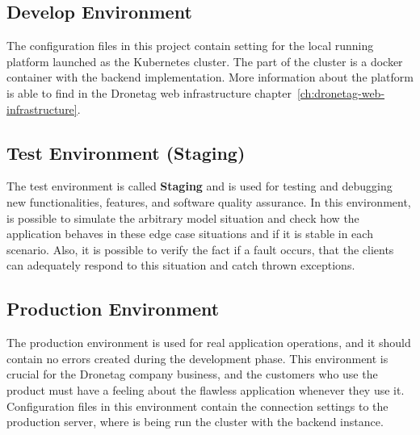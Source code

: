 \subsection{Develop Environment}\label{subsec:develop-environment}
The configuration files in this project contain setting for the local running platform launched as the Kubernetes cluster.
The part of the cluster is a docker container with the backend implementation.
More information about the platform is able to find in the Dronetag web infrastructure chapter~\ref{ch:dronetag-web-infrastructure}.


\subsection{Test Environment (Staging)}\label{subsec:test-environment}
The test environment is called \textbf{Staging} and is used for testing and debugging new functionalities, features, and software quality assurance.\cite{sqa}
In this environment, is possible to simulate the arbitrary model situation and check how the application behaves in these edge case situations and if it is stable in each scenario.
Also, it is possible to verify the fact if a fault occurs, that the clients can adequately respond to this situation and catch thrown exceptions.


\subsection{Production Environment}\label{subsec:production-environment}
The production environment is used for real application operations, and it should contain no errors created during the development phase.
This environment is crucial for the Dronetag company business, and the customers who use the product must have a feeling about the flawless application whenever they use it.
Configuration files in this environment contain the connection settings to the production server, where is being run the cluster with the backend instance.
